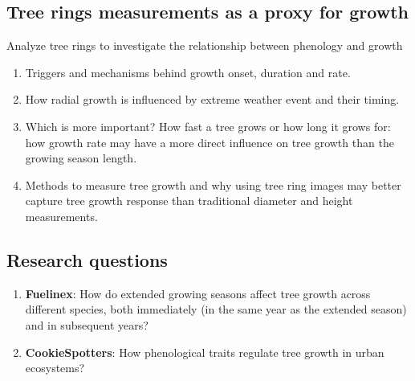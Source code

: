 \documentclass{article}
\begin{document}
\subsection{Tree rings measurements as a proxy for growth}
Analyze tree rings to investigate the relationship between phenology and growth

\begin{enumerate}
	\item Triggers and mechanisms behind growth onset, duration and rate.
	\item How radial growth is influenced by extreme weather event and their timing. 
	\item Which is more important? How fast a tree grows or how long it grows for: how growth rate may have a more direct influence on tree growth than the growing season length. 
	\item Methods to measure tree growth and why using tree ring images may better capture tree growth response than traditional diameter and height measurements.
\end{enumerate}



\subsection {Research questions}
\begin {enumerate}
	\item \textbf{Fuelinex}: How do extended growing seasons affect tree growth across different species, both immediately (in the same year as the extended season) and in subsequent years?
	\item \textbf {CookieSpotters}: How phenological traits regulate tree growth in urban ecosystems?
\end {enumerate}
\end{document}
